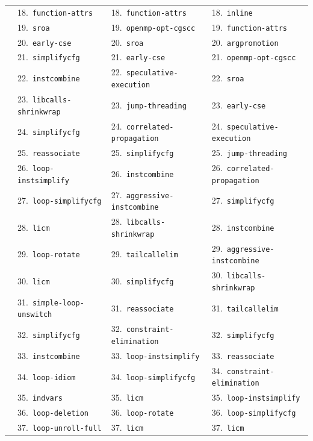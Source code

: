 \documentclass[11pt,a4paper]{article}
\begin{document}
{\begin{longtable}{llll}
 & 18.~\texttt{function-attrs} & 18.~\texttt{function-attrs} & 18.~\texttt{inline} \\
 & 19.~\texttt{sroa} & 19.~\texttt{openmp-opt-cgscc} & 19.~\texttt{function-attrs} \\
 & 20.~\texttt{early-cse} & 20.~\texttt{sroa} & 20.~\texttt{argpromotion} \\
 & 21.~\texttt{simplifycfg} & 21.~\texttt{early-cse} & 21.~\texttt{openmp-opt-cgscc} \\
 & 22.~\texttt{instcombine} & 22.~\texttt{speculative-execution} & 22.~\texttt{sroa} \\
 & 23.~\texttt{libcalls-shrinkwrap} & 23.~\texttt{jump-threading} & 23.~\texttt{early-cse} \\
 & 24.~\texttt{simplifycfg} & 24.~\texttt{correlated-propagation} & 24.~\texttt{speculative-execution} \\
 & 25.~\texttt{reassociate} & 25.~\texttt{simplifycfg} & 25.~\texttt{jump-threading} \\
 & 26.~\texttt{loop-instsimplify} & 26.~\texttt{instcombine} & 26.~\texttt{correlated-propagation} \\
 & 27.~\texttt{loop-simplifycfg} & 27.~\texttt{aggressive-instcombine} & 27.~\texttt{simplifycfg} \\
 & 28.~\texttt{licm} & 28.~\texttt{libcalls-shrinkwrap} & 28.~\texttt{instcombine} \\
 & 29.~\texttt{loop-rotate} & 29.~\texttt{tailcallelim} & 29.~\texttt{aggressive-instcombine} \\
 & 30.~\texttt{licm} & 30.~\texttt{simplifycfg} & 30.~\texttt{libcalls-shrinkwrap} \\
 & 31.~\texttt{simple-loop-unswitch} & 31.~\texttt{reassociate} & 31.~\texttt{tailcallelim} \\
 & 32.~\texttt{simplifycfg} & 32.~\texttt{constraint-elimination} & 32.~\texttt{simplifycfg} \\
 & 33.~\texttt{instcombine} & 33.~\texttt{loop-instsimplify} & 33.~\texttt{reassociate} \\
 & 34.~\texttt{loop-idiom} & 34.~\texttt{loop-simplifycfg} & 34.~\texttt{constraint-elimination} \\
 & 35.~\texttt{indvars} & 35.~\texttt{licm} & 35.~\texttt{loop-instsimplify} \\
 & 36.~\texttt{loop-deletion} & 36.~\texttt{loop-rotate} & 36.~\texttt{loop-simplifycfg} \\
 & 37.~\texttt{loop-unroll-full} & 37.~\texttt{licm} & 37.~\texttt{licm} \\

\end{longtable}}
\end{document}
